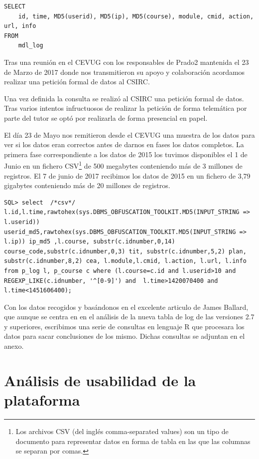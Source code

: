 \begin{lstlisting}
SELECT
    id, time, MD5(userid), MD5(ip), MD5(course), module, cmid, action, url, info
FROM
    mdl_log
\end{lstlisting}


Tras una reunión en el CEVUG con los responsables de Prado2 mantenida el 23 de Marzo de 2017 donde nos transmitieron su apoyo y colaboración acordamos realizar una petición formal de datos al CSIRC.

Una vez definida la consulta se realizó al CSIRC una petición formal de datos. Tras varios intentos infructuosos de realizar la petición de forma telemática por parte del tutor se optó por realizarla de forma presencial en papel.

El día 23 de Mayo nos remitieron desde el CEVUG una muestra de los datos para ver si los datos eran correctos antes de darnos en fases los datos completos. La primera fase correspondiente a los datos de 2015 los tuvimos disponibles el 1 de Junio en un fichero CSV\footnote{Los archivos CSV (del inglés comma-separated values) son un tipo de documento para representar datos en forma de tabla en las que las columnas se separan por comas.} de 500 megabytes conteniendo más de 3 millones de registros. El 7 de junio de 2017 recibimos los datos de 2015 en un fichero de 3,79 gigabytes conteniendo más de 20 millones de registros.

\begin{lstlisting}
SQL> select  /*csv*/ l.id,l.time,rawtohex(sys.DBMS_OBFUSCATION_TOOLKIT.MD5(INPUT_STRING => l.userid)) userid_md5,rawtohex(sys.DBMS_OBFUSCATION_TOOLKIT.MD5(INPUT_STRING => l.ip)) ip_md5 ,l.course, substr(c.idnumber,0,14) course_code,substr(c.idnumber,0,3) tit, substr(c.idnumber,5,2) plan, substr(c.idnumber,8,2) cea, l.module,l.cmid, l.action, l.url, l.info from p_log l, p_course c where (l.course=c.id and l.userid>10 and REGEXP_LIKE(c.idnumber, '^[0-9]') and  l.time>1420070400 and l.time<1451606400);

\end{lstlisting}

Con los datos recogidos y basándonos en el excelente articulo\cite{art_02} de James Ballard, que aunque se centra en en el análisis de la nueva tabla de log de las versiones 2.7 y superiores, escribimos una serie de consultas en lenguaje R que procesara los datos para sacar conclusiones de los mismo. Dichas consultas se adjuntan en el anexo.

\section{Análisis de usabilidad de la plataforma}

